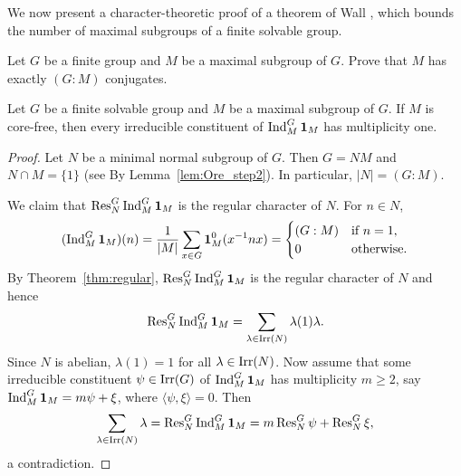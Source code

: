 


We now present a character-theoretic proof of a theorem of Wall \cite{MR125156}, 
which bounds the number of maximal subgroups of a finite solvable group. 

\begin{exercise}
    \label{xca:number_maximals}
    Let $G$ be a finite group and $M$ be a maximal subgroup of $G$.
    Prove that $M$ has exactly $(G:M)$ conjugates. 
\end{exercise}

\begin{lemma}
\label{lem:multiplicity-free}
    Let $G$ be a finite solvable group and $M$ be a maximal subgroup of $G$. If $M$ is core-free, then 
    every irreducible constituent of $\operatorname{Ind}_M^G\mathbf{1}_M$ has multiplicity one. 
\end{lemma}

\begin{proof}
    Let $N$ be a minimal normal subgroup of $G$. Then 
    $G=NM$ and $N\cap M=\{1\}$ (see 
    By Lemma~\ref{lem:Ore_step2}). In particular, 
    $|N|=(G:M)$. 

    We claim that 
    $\operatorname{Res}_N^G\operatorname{Ind}_M^G\mathbf{1}_M$ is the regular character of $N$. For 
    $n\in N$, 
    \[
    (\operatorname{Ind}_M^G\mathbf{1}_M)(n)=\frac{1}{|M|}\sum_{x\in G}\mathbf{1}_M^0(x^{-1}nx)
    =\begin{cases}
        (G:M) & \text{if $n=1$,}\\
        0 & \text{otherwise.}
    \end{cases}
    \]
    By Theorem~\ref{thm:regular}, 
    $\operatorname{Res}_N^G\operatorname{Ind}_M^G\mathbf{1}_M$ is the regular character of $N$ and hence 
    \[
    \operatorname{Res}_N^G\operatorname{Ind}_M^G\mathbf{1}_M=\sum_{\lambda\in\operatorname{Irr}(N)}\lambda(1)\lambda.
    \]
    Since $N$ is abelian, $\lambda(1)=1$ for all $\lambda\in\operatorname{Irr}(N)$. Now assume
    that some irreducible constituent $\psi\in\operatorname{Irr}(G)$ of $\operatorname{Ind}_M^G\mathbf{1}_M$ has
    multiplicity $m\geq2$, say $\operatorname{Ind}_M^G\mathbf{1}_M=m\psi+\xi$, where $\langle\psi,\xi\rangle=0$. 
    Then 
    \[
    \sum_{\lambda\in\operatorname{Irr}(N)}\lambda=\operatorname{Res}_N^G\operatorname{Ind}_M^G\mathbf{1}_M=m\operatorname{Res}_N^G\psi+\operatorname{Res}_N^G\xi,
    \]
    a contradiction. 
\end{proof}

